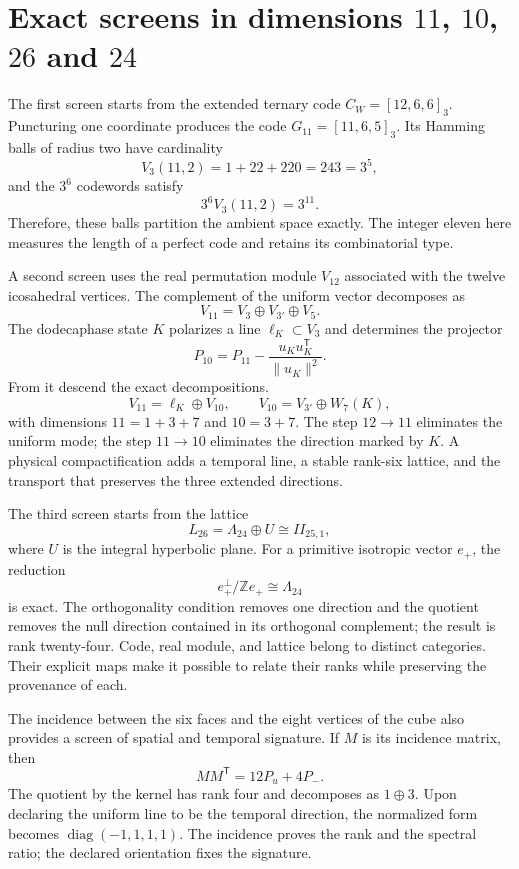 \section{Exact screens in dimensions \(11\), \(10\), \(26\) and \(24\)}

The first screen starts from the extended ternary code
\(C_W=[12,6,6]_3\). Puncturing one coordinate produces the code
\(G_{11}=[11,6,5]_3\). Its Hamming balls of radius two have cardinality
\[
 V_3(11,2)=1+22+220=243=3^5,
\]
and the \(3^6\) codewords satisfy
\[
 3^6V_3(11,2)=3^{11}.
\]
Therefore, these balls partition the ambient space exactly. The integer
eleven here measures the length of a perfect code and retains its
combinatorial type.

A second screen uses the real permutation module \(V_{12}\) associated with
the twelve icosahedral vertices. The complement of the uniform vector
decomposes as
\[
 V_{11}=V_3\oplus V_{3'}\oplus V_5.
\]
The dodecaphase state \(K\) polarizes a line \(\ell_K\subset V_3\) and
determines the projector
\[
 P_{10}=P_{11}-\frac{u_Ku_K^{\mathsf T}}{\lVert u_K\rVert^2}.
\]
From it descend the exact decompositions.
\[
 V_{11}=\ell_K\oplus V_{10},\qquad
 V_{10}=V_{3'}\oplus W_7(K),
\]
with dimensions \(11=1+3+7\) and \(10=3+7\). The step
\(12\to11\) eliminates the uniform mode; the step \(11\to10\) eliminates the
direction marked by \(K\). A physical compactification adds a
temporal line, a stable rank-six lattice, and the transport that preserves the
three extended directions.

The third screen starts from the lattice
\[
 L_{26}=\Lambda_{24}\oplus U\cong II_{25,1},
\]
where \(U\) is the integral hyperbolic plane. For a primitive isotropic
vector \(e_+\), the reduction
\[
 e_+^\perp/\mathbb Ze_+\cong\Lambda_{24}
\]
is exact. The orthogonality condition removes one direction and the quotient
removes the null direction contained in its orthogonal complement; the result is rank
twenty-four. Code, real module, and lattice belong to distinct
categories. Their explicit maps make it possible to relate their ranks while preserving the
provenance of each.

The incidence between the six faces and the eight vertices of the cube also provides
a screen of spatial and temporal signature. If \(M\) is its incidence
matrix, then
\[
 MM^{\mathsf T}=12P_u+4P_-.
\]
The quotient by the kernel has rank four and decomposes as
\(1\oplus3\). Upon declaring the uniform line to be the temporal direction, the
normalized form becomes \(\operatorname{diag}(-1,1,1,1)\). The incidence proves
the rank and the spectral ratio; the declared orientation fixes the signature.

